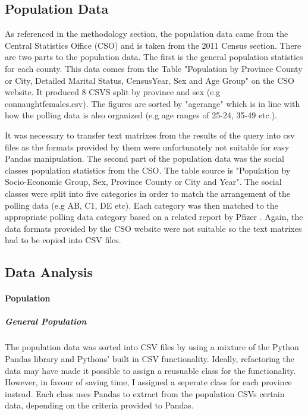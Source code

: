 \subsection{Population Data}
As referenced in the methodology section, the population data came from the Central Statistics Office (CSO) and is taken from the 2011 Census section. There are two parts to the population data. The first is the general population statistics for each county. This data comes from the Table "Population by Province County or City, Detailed Marital Status, CensusYear, Sex and Age Group" on the CSO website. It produced 8 CSVS split by province and sex (e.g connaught\textunderscore females.csv). The figures are sorted by "age\textunderscore range" which is in line with how the polling data is also organized (e.g age ranges of 25-24, 35-49 etc.).

It was necessary to transfer text matrixes from the results of the query into csv files as the formats provided by them were unfortunately not suitable for easy Pandas manipulation. The second part of the population data was the social classes population statistics from the CSO. The table source is "Population by Socio-Economic Group, Sex, Province County or City and Year". The social classes were split into five categories in order to match the arrangement of the polling data (e.g AB, C1, DE etc). Each category was then matched to the appropriate polling data category based on a related report by Pfizer \cite{pfizer}. Again, the data formats provided by the CSO website were not suitable so the text matrixes had to be copied into CSV files.
\subsection{Data Analysis}
\paragraph{Population}
\subparagraph{General Population}
The population data was sorted into CSV files by using a mixture of the Python Pandas library and Pythons’ built in CSV functionality. Ideally, refactoring the data may have made it possible to assign a reusuable class for the functionality. However, in favour of saving time, I assigned a seperate class for each province instead. Each class uses Pandas to extract from the population CSVs certain data, depending on the criteria provided to Pandas. 

